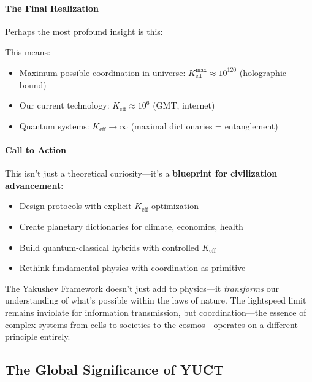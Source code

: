 \documentclass[11pt,a4paper]{article}
\begin{document}
	\paragraph{The Final Realization}
	Perhaps the most profound insight is this:
	
	\begin{center}
	\end{center}
	
	This means:
	\begin{itemize}
		\item Maximum possible coordination in universe: $K_{\mathrm{eff}}^{\max} \approx 10^{120}$ (holographic bound)
		\item Our current technology: $K_{\mathrm{eff}} \approx 10^6$ (GMT, internet)
		\item Quantum systems: $K_{\mathrm{eff}} \to \infty$ (maximal dictionaries = entanglement)
	\end{itemize}
	
	\paragraph{Call to Action}
	This isn't just a theoretical curiosity—it's a \textbf{blueprint for civilization advancement}:
	
	\begin{itemize}
		\item Design protocols with explicit $K_{\mathrm{eff}}$ optimization
		\item Create planetary dictionaries for climate, economics, health
		\item Build quantum-classical hybrids with controlled $K_{\mathrm{eff}}$
		\item Rethink fundamental physics with coordination as primitive
	\end{itemize}
	
	The Yakushev Framework doesn't just add to physics—it \emph{transforms} our understanding of what's possible within the laws of nature. The lightspeed limit remains inviolate for information transmission, but coordination—the essence of complex systems from cells to societies to the cosmos—operates on a different principle entirely.
	
	\subsection{The Global Significance of YUCT}
	
\end{document}
